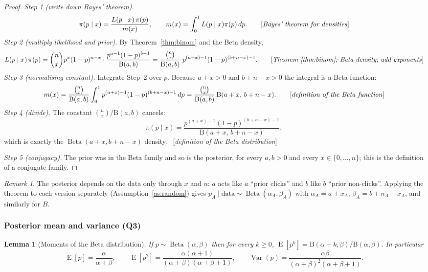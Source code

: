 \documentclass[11pt]{article}
\newtheorem{lemma}{Lemma}
\theoremstyle{definition}
\theoremstyle{remark}
\newtheorem{remark}{Remark}
\newcommand{\E}{\operatorname{E}}
\newcommand{\Var}{\operatorname{Var}}
\newcommand{\Betad}{\operatorname{Beta}}
\newcommand{\Bfun}{\mathrm{B}}
\newcommand{\data}{\text{data}}
\newcommand{\rulename}[1]{\ {[\emph{#1}]}}
\begin{document}
\begin{proof}
\emph{Step 1 (write down Bayes' theorem).}
\[
\pi(p\mid x)=\frac{L(p\mid x)\,\pi(p)}{m(x)},\qquad m(x)=\int_0^1 L(p\mid x)\pi(p)\,dp .
\tag*{[\emph{Bayes' theorem for densities}]}
\]
\emph{Step 2 (multiply likelihood and prior).} By Theorem~\ref{thm:binom} and the Beta density,
\[
L(p\mid x)\,\pi(p)=\binom nx p^x(1-p)^{n-x}\cdot\frac{p^{a-1}(1-p)^{b-1}}{\Bfun(a,b)}
=\frac{\binom nx}{\Bfun(a,b)}\;p^{(a+x)-1}(1-p)^{(b+n-x)-1}.
\tag*{[\emph{Theorem~\ref{thm:binom}; Beta density; add exponents}]}
\]
\emph{Step 3 (normalising constant).} Integrate Step~2 over $p$. Because $a+x>0$ and $b+n-x>0$
the integral is a Beta function:
\[
m(x)=\frac{\binom nx}{\Bfun(a,b)}\int_0^1 p^{(a+x)-1}(1-p)^{(b+n-x)-1}\,dp
=\frac{\binom nx}{\Bfun(a,b)}\,\Bfun(a+x,\,b+n-x).
\tag*{[\emph{definition of the Beta function}]}
\]
\emph{Step 4 (divide).} The constant $\binom nx/\Bfun(a,b)$ cancels:
\[
\pi(p\mid x)=\frac{p^{(a+x)-1}(1-p)^{(b+n-x)-1}}{\Bfun(a+x,\,b+n-x)},
\]
which is exactly the $\Betad(a+x,b+n-x)$ density. \rulename{definition of the Beta distribution}

\emph{Step 5 (conjugacy).} The prior was in the Beta family and so is the posterior, for every
$a,b>0$ and every $x\in\{0,\dots,n\}$; this is the definition of a conjugate family.
\end{proof}

\begin{remark}
The posterior depends on the data only through $x$ and $n$: $a$ acts like $a$ ``prior clicks'' and $b$ like
$b$ ``prior non-clicks''. Applying the theorem to each version separately (Assumption~\ref{as:random}) gives
$p_A\mid\data\sim\Betad(\alpha_A,\beta_A)$ with $\alpha_A=a+x_A$, $\beta_A=b+n_A-x_A$, and similarly for $B$.
\end{remark}

\subsubsection{Posterior mean and variance (Q3)}

\begin{lemma}[Moments of the Beta distribution]\label{lem:moments}
If $p\sim\Betad(\alpha,\beta)$ then for every $k\ge0$,
$\E[p^k]=\Bfun(\alpha+k,\beta)/\Bfun(\alpha,\beta)$. In particular
\[
\E[p]=\frac{\alpha}{\alpha+\beta},\qquad
\E[p^2]=\frac{\alpha(\alpha+1)}{(\alpha+\beta)(\alpha+\beta+1)},\qquad
\Var(p)=\frac{\alpha\beta}{(\alpha+\beta)^2(\alpha+\beta+1)} .
\]
\end{lemma}
\end{document}

